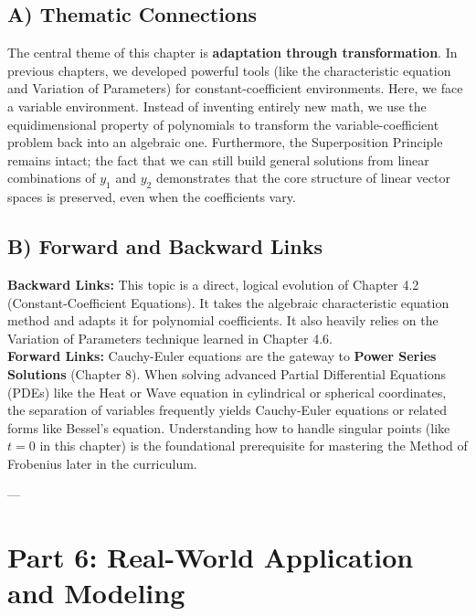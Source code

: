 \documentclass{article}
\begin{document}
\subsection{A) Thematic Connections}
The central theme of this chapter is \textbf{adaptation through transformation}. In previous chapters, we developed powerful tools (like the characteristic equation and Variation of Parameters) for constant-coefficient environments. Here, we face a variable environment. Instead of inventing entirely new math, we use the equidimensional property of polynomials to transform the variable-coefficient problem back into an algebraic one. Furthermore, the Superposition Principle remains intact; the fact that we can still build general solutions from linear combinations of $y_1$ and $y_2$ demonstrates that the core structure of linear vector spaces is preserved, even when the coefficients vary.

\subsection{B) Forward and Backward Links}
\textbf{Backward Links:} This topic is a direct, logical evolution of Chapter 4.2 (Constant-Coefficient Equations). It takes the algebraic characteristic equation method and adapts it for polynomial coefficients. It also heavily relies on the Variation of Parameters technique learned in Chapter 4.6. \\
\textbf{Forward Links:} Cauchy-Euler equations are the gateway to \textbf{Power Series Solutions} (Chapter 8). When solving advanced Partial Differential Equations (PDEs) like the Heat or Wave equation in cylindrical or spherical coordinates, the separation of variables frequently yields Cauchy-Euler equations or related forms like Bessel's equation. Understanding how to handle singular points (like $t=0$ in this chapter) is the foundational prerequisite for mastering the Method of Frobenius later in the curriculum.

---

\section{Part 6: Real-World Application and Modeling}
\end{document}
